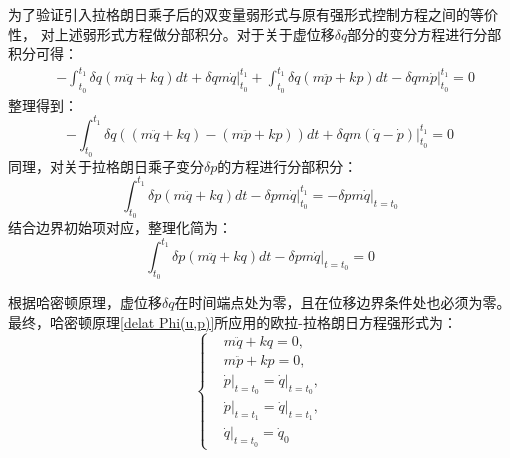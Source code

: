 为了验证引入拉格朗日乘子后的双变量弱形式与原有强形式控制方程之间的等价性，
对上述弱形式方程做分部积分。对于关于虚位移$\delta q$部分的变分方程进行分部积分可得：
\begin{equation}
    \begin{aligned}
        & - \int_{t_0}^{t_1} \delta q (m\ddot q + k q ) dt + \delta q m \dot q \vert_{t_0}^{t_1}
        + \int_{t_0}^{t_1} \delta q (m\ddot p + k p ) dt - \delta q m \dot p \vert_{t_0}^{t_1} = 0
    \end{aligned}
\end{equation}
整理得到：
\begin{equation}
    - \int_{t_0}^{t_1} \delta q \left( (m\ddot q + k q ) - (m\ddot p + k p ) \right) dt + \delta q m (\dot q - \dot p)\vert_{t_0}^{t_1} = 0
\end{equation}
同理，对关于拉格朗日乘子变分$\delta p$的方程进行分部积分：
\begin{equation}
    \int_{t_0}^{t_1} \delta p (m\ddot q + k q ) dt - \delta p m \dot q \vert_{t_0}^{t_1} = - \delta p m \dot q \vert_{t=t_0}
\end{equation}
结合边界初始项对应，整理化简为：
\begin{equation}
    \int_{t_0}^{t_1} \delta p (m\ddot q + k q ) dt - \delta p m \dot q \vert_{t=t_0} = 0
\end{equation}

根据哈密顿原理，虚位移$\delta q$在时间端点处为零，且在位移边界条件处也必须为零。
最终，哈密顿原理\eqref{delat Phi(u,p)}所应用的欧拉-拉格朗日方程强形式为：
\begin{equation}
    \left \{
    \begin{aligned}
        & m\ddot q + k q = 0, \\
        & m\ddot p + k p = 0,  \\
        & \dot p \vert_{t=t_0} = \dot q \vert_{t=t_0}, \\
        & \dot p \vert_{t=t_1} = \dot q \vert_{t=t_1}, \\
        & \dot q \vert_{t=t_0} = \dot q_0
    \end{aligned}
    \right .
\end{equation}

